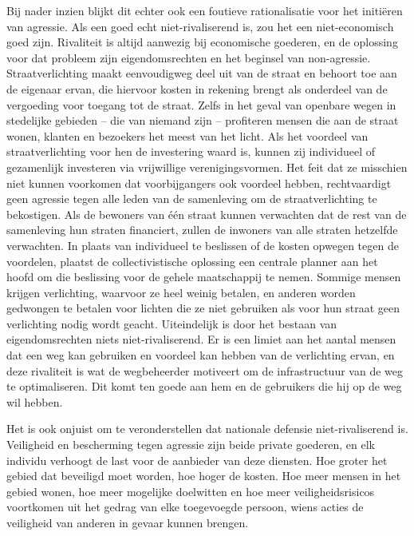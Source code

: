 Bij nader inzien blijkt dit echter ook een foutieve rationalisatie voor het initiëren van agressie. Als een goed echt niet-rivaliserend is, zou het een niet-economisch goed zijn. Rivaliteit is altijd aanwezig bij economische goederen, en de oplossing voor dat probleem zijn eigendomsrechten en het beginsel van non-agressie. Straatverlichting maakt eenvoudigweg deel uit van de straat en behoort toe aan de eigenaar ervan, die hiervoor kosten in rekening brengt als onderdeel van de vergoeding voor toegang tot de straat. Zelfs in het geval van openbare wegen in stedelijke gebieden -- die van niemand zijn -- profiteren mensen die aan de straat wonen, klanten en bezoekers het meest van het licht. Als het voordeel van straatverlichting voor hen de investering waard is, kunnen zij individueel of gezamenlijk investeren via vrijwillige verenigingsvormen. Het feit dat ze misschien niet kunnen voorkomen dat voorbijgangers ook voordeel hebben, rechtvaardigt geen agressie tegen alle leden van de samenleving om de straatverlichting te bekostigen. Als de bewoners van één straat kunnen verwachten dat de rest van de samenleving hun straten financiert, zullen de inwoners van alle straten hetzelfde verwachten. In plaats van individueel te beslissen of de kosten opwegen tegen de voordelen, plaatst de collectivistische oplossing een centrale planner aan het hoofd om die beslissing voor de gehele maatschappij te nemen. Sommige mensen krijgen verlichting, waarvoor ze heel weinig betalen, en anderen worden gedwongen te betalen voor lichten die ze niet gebruiken als voor hun straat geen verlichting nodig wordt geacht. Uiteindelijk is door het bestaan van eigendomsrechten niets niet-rivaliserend. Er is een limiet aan het aantal mensen dat een weg kan gebruiken en voordeel kan hebben van de verlichting ervan, en deze rivaliteit is wat de wegbeheerder motiveert om de infrastructuur van de weg te optimaliseren. Dit komt ten goede aan hem en de gebruikers die hij op de weg wil hebben.

Het is ook onjuist om te veronderstellen dat nationale defensie niet-rivaliserend is. Veiligheid en bescherming tegen agressie zijn beide private goederen, en elk individu verhoogt de last voor de aanbieder van deze diensten. Hoe groter het gebied dat beveiligd moet worden, hoe hoger de kosten. Hoe meer mensen in het gebied wonen, hoe meer mogelijke doelwitten en hoe meer veiligheidsrisico\textquotesingle s voortkomen uit het gedrag van elke toegevoegde persoon, wiens acties de veiligheid van anderen in gevaar kunnen brengen.

